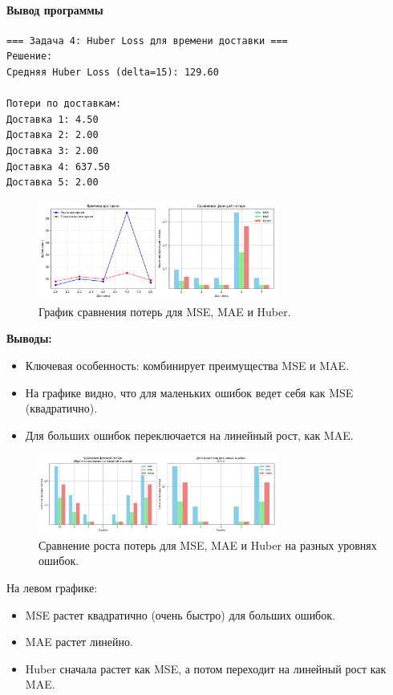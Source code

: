 \paragraph{Вывод программы}
\begin{verbatim}
=== Задача 4: Huber Loss для времени доставки ===
Решение:
Средняя Huber Loss (delta=15): 129.60

Потери по доставкам:
Доставка 1: 4.50
Доставка 2: 2.00
Доставка 3: 2.00
Доставка 4: 637.50
Доставка 5: 2.00
\end{verbatim}

\begin{figure}[h!]
    \centering
    \includegraphics[width=0.7\textwidth]{chapters/general/imgs/huber.png}
    \caption{График сравнения потерь для MSE, MAE и Huber.}
    \label{fig:huber_graph}
\end{figure}

\noindent\textbf{Выводы:}
\begin{itemize}
    \item Ключевая особенность: комбинирует преимущества MSE и MAE.
    \item На графике видно, что для маленьких ошибок ведет себя как MSE (квадратично).
    \item Для больших ошибок переключается на линейный рост, как MAE.
\end{itemize}

\begin{figure}[h!]
    \centering
    \includegraphics[width=0.7\textwidth]{chapters/general/imgs/huber_plus.png}
    \caption{Сравнение роста потерь для MSE, MAE и Huber на разных уровнях ошибок.}
    \label{fig:huber_plus}
\end{figure}

\noindent На левом графике:
\begin{itemize}
    \item MSE растет квадратично (очень быстро) для больших ошибок.
    \item MAE растет линейно.
    \item Huber сначала растет как MSE, а потом переходит на линейный рост как MAE.
\end{itemize}

